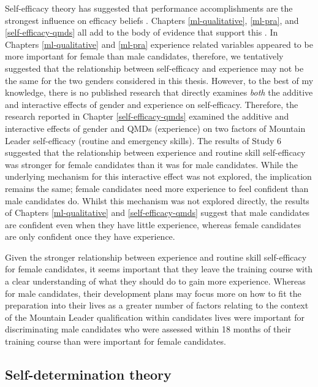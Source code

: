 \documentclass[
  12pt,
  a4paper,
]{book}
\begin{document}
Self-efficacy theory has suggested that performance accomplishments are the strongest influence on efficacy beliefs \citep{Bandura1982}. Chapters \ref{ml-qualitative}, \ref{ml-pra}, and \ref{self-efficacy-qmds} all add to the body of evidence that support this \citep[e.g.,][]{Anstiss2018, Chase2003, Samson2014, Shipherd2019}. In Chapters \ref{ml-qualitative} and \ref{ml-pra} experience related variables appeared to be more important for female than male candidates, therefore, we tentatively suggested that the relationship between self-efficacy and experience may not be the same for the two genders considered in this thesis. However, to the best of my knowledge, there is no published research that directly examines \emph{both} the additive and interactive effects of gender and experience on self-efficacy. Therefore, the research reported in Chapter \ref{self-efficacy-qmds} examined the additive and interactive effects of gender and QMDs (experience) on two factors of Mountain Leader self-efficacy (routine and emergency skills). The results of Study 6 suggested that the relationship between experience and routine skill self-efficacy was stronger for female candidates than it was for male candidates. While the underlying mechanism for this interactive effect was not explored, the implication remains the same; female candidates need more experience to feel confident than male candidates do. Whilst this mechanism was not explored directly, the results of Chapters \ref{ml-qualitative} and \ref{self-efficacy-qmds} suggest that male candidates are confident even when they have little experience, whereas female candidates are only confident once they have experience.

Given the stronger relationship between experience and routine skill self-efficacy for female candidates, it seems important that they leave the training course with a clear understanding of what they should do to gain more experience. Whereas for male candidates, their development plans may focus more on how to fit the preparation into their lives as a greater number of factors relating to the context of the Mountain Leader qualification within candidates lives were important for discriminating male candidates who were assessed within 18 months of their training course than were important for female candidates.

\hypertarget{self-determination-theory}{%
\subsection{Self-determination theory}\label{self-determination-theory}}
\end{document}
